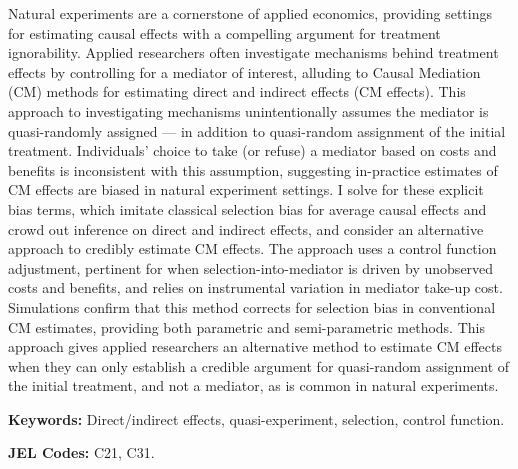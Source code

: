 \noindent
Natural experiments are a cornerstone of applied economics, providing settings for estimating causal effects with a compelling argument for treatment ignorability.
Applied researchers often investigate mechanisms behind treatment effects by controlling for a mediator of interest, alluding to Causal Mediation (CM) methods for estimating direct and indirect effects (CM effects).
This approach to investigating mechanisms unintentionally assumes the mediator is quasi-randomly assigned --- in addition to quasi-random assignment of the initial treatment.
Individuals' choice to take (or refuse) a mediator based on costs and benefits is inconsistent with this assumption, suggesting in-practice estimates of CM effects are biased in natural experiment settings.
I solve for these explicit bias terms, which imitate classical selection bias for average causal effects and crowd out inference on direct and indirect effects, and consider an alternative approach to credibly estimate CM effects.
The approach uses a control function adjustment, pertinent for when selection-into-mediator is driven by unobserved costs and benefits, and relies on instrumental variation in mediator take-up cost.
Simulations confirm that this method corrects for selection bias in conventional CM estimates, providing both parametric and semi-parametric methods.
This approach gives applied researchers an alternative method to estimate CM effects when they can only establish a credible argument for quasi-random assignment of the initial treatment, and not a mediator, as is common in natural experiments.

\vspace{0.5cm}
\noindent
\textbf{Keywords:}
Direct/indirect effects, quasi-experiment, selection, control function.

\vspace{0.1cm}
\noindent
\textbf{JEL Codes:}
C21, C31.
